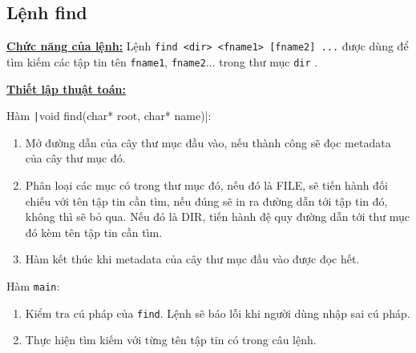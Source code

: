 \subsection{Lệnh find}
\underline{\textbf{Chức năng của lệnh:}} Lệnh \verb|find <dir> <fname1> [fname2] ...| được dùng để tìm kiếm các tập tin tên \verb|fname1|, \verb|fname2|... trong thư mục \verb|dir| \cite{mit-xv6}.

\underline{\textbf{Thiết lập thuật toán:}}

Hàm \texttt|void find(char* root, char* name)|:
\begin{enumerate}[labelindent=1em, labelsep=0.2cm, leftmargin=1cm, wide=\parindent, topsep=0.1cm, itemsep=-1ex, partopsep=1.5ex, parsep=1.5ex]
	\item Mở đường dẫn của cây thư mục đầu vào, nếu thành công sẽ đọc metadata của cây thư mục đó.
	\item Phân loại các mục có trong thư mục đó, nếu đó là FILE, sẽ tiến hành đối chiếu với tên tập tin cần tìm, nếu đúng sẽ in ra đường dẫn tới tập tin đó, không thì sẽ bỏ qua. Nếu đó là DIR, tiến hành đệ quy đường dẫn tới thư mục đó kèm tên tập tin cần tìm.
	\item Hàm kết thúc khi metadata của cây thư mục đầu vào được đọc hết.
\end{enumerate}

Hàm \verb|main|:
\begin{enumerate}[labelindent=1em, labelsep=0.2cm, leftmargin=1cm, wide=\parindent, topsep=0.1cm, itemsep=-1ex, partopsep=1.5ex, parsep=1.5ex]
	\item Kiểm tra cú pháp của \verb|find|. Lệnh sẽ báo lỗi khi người dùng nhập sai cú pháp.
	\item Thực hiện tìm kiếm với từng tên tập tin có trong câu lệnh.
\end{enumerate}

